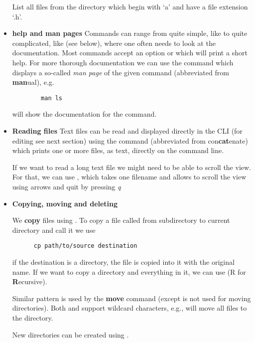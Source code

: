 \begin{itemize}
    \begin{exercise}
    List all files from the directory  which begin with `a' and have a file extension `.h'.
    \end{exercise}
\item
  \textbf{help and man pages}
  Commands can range from quite simple, like  to quite complicated, like  (see below), where one often needs to look at the documentation. Most commands accept an option  or  which will print a short help. For more thorough documentation we can use the  command which displays a so-called \emph{man page} of the given command (abbreviated from \textbf{man}ual), e.g.
    \begin{lstlisting}
        man ls
\end{lstlisting}
  will show the documentation for the  command.
\item
  \textbf{Reading files}
  Text files can be read and displayed directly in the CLI (for editing see next section) using the  command (abbreviated from con\textbf{cat}enate) which prints one or more files, as text, directly on the command line.

  If we want to read a long text file we might need to be able to scroll the view. For that, we can use , which takes one filename and allows to scroll the view using arrows and quit by pressing \emph{q}
\item
  \textbf{Copying, moving and deleting}

  We \textbf{copy} files using . To copy a file called  from subdirectory  to current directory and call it  we use
  \begin{lstlisting}
      cp path/to/source destination
\end{lstlisting}
  if the destination is a directory, the file is copied into it with the original name. If we want to copy a directory and everything in it, we can use  (R for \textbf{R}ecursive).

  Similar pattern is used by the \textbf{move} command  (except  is not used for moving directories). Both  and  support wildcard characters, e.g.,  will move all  files to the  directory.

  New directories can be created using .


\end{itemize}
